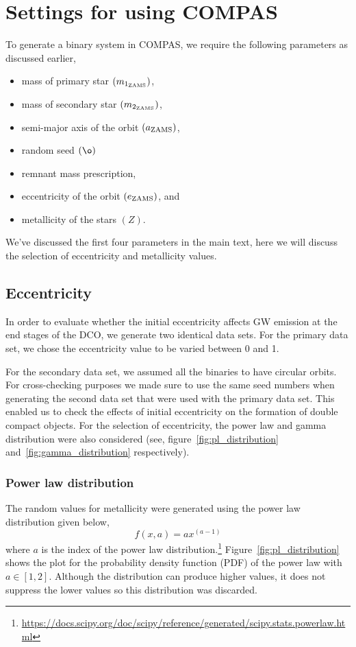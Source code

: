 \section{Settings for using COMPAS}
\label{sec:appA}
To generate a binary system in COMPAS, we require the following parameters as discussed earlier,
\begin{itemize}
    \item mass of primary star $(m_{1_{\text{ZAMS}}})$,
    \item mass of secondary star $(m_{2_{\text{ZAMS}}})$,
    \item semi-major axis of the orbit $(a_{\text{ZAMS}})$,
    \item random seed $(\o)$
    \item remnant mass prescription,
    \item eccentricity of the orbit $(e_\text{ZAMS})$, and
    \item metallicity of the stars $\left(Z\right)$.
\end{itemize}

We've discussed the first four parameters in the main text, here we will discuss the selection of eccentricity and metallicity values.

\subsection{\textbf{Eccentricity}}
\label{subsec:eccentricity}
In order to evaluate whether the initial eccentricity affects GW emission at the end stages of the DCO, we generate two identical data sets.
For the primary data set, we chose the eccentricity value to be varied between 0 and 1.

For the secondary data set, we assumed all the binaries to have circular orbits.
For cross-checking purposes we made sure to use the same seed numbers when generating the second data set that were used with the primary data set.
This enabled us to check the effects of initial eccentricity on the formation of double compact objects.
For the selection of eccentricity, the power law and gamma distribution were also considered (see, figure~\ref{fig:pl_distribution} and~\ref{fig:gamma_distribution} respectively).

\subsubsection*{\textbf{Power law distribution}} The random values for metallicity were generated using the power law distribution given below,
\begin{equation}
    f(x, a) = ax^{(a-1)}
    \label{eq:powerlaw_distribution}
\end{equation}
where $a$ is the index of the power law distribution.\footnote{\url{https://docs.scipy.org/doc/scipy/reference/generated/scipy.stats.powerlaw.html}}
Figure~\ref{fig:pl_distribution} shows the plot for the probability density function (PDF) of the power law with $a \in [1, 2]$.
Although the distribution can produce higher values, it does not suppress the lower values so this distribution was discarded.
